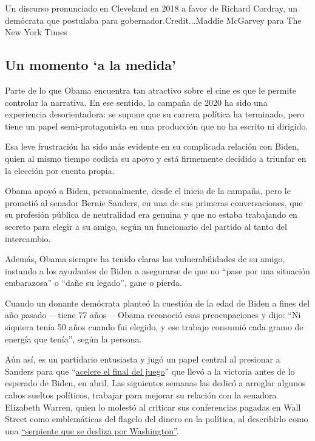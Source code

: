 Un discurso pronunciado en Cleveland en 2018 a favor de Richard Cordray,
un demócrata que postulaba para gobernador.Credit...Maddie McGarvey para
The New York Times

\hypertarget{un-momento-a-la-medida}{%
\subsection{Un momento `a la medida'}\label{un-momento-a-la-medida}}

Parte de lo que Obama encuentra tan atractivo sobre el cine es que le
permite controlar la narrativa. En ese sentido, la campaña de 2020 ha
sido una experiencia desorientadora: se supone que su carrera política
ha terminado, pero tiene un papel semi-protagonista en una producción
que no ha escrito ni dirigido.

Esa leve frustración ha sido más evidente en su complicada relación con
Biden, quien al mismo tiempo codicia su apoyo y está firmemente decidido
a triunfar en la elección por cuenta propia.

Obama apoyó a Biden, personalmente, desde el inicio de la campaña, pero
le prometió al senador Bernie Sanders, en una de sus primeras
conversaciones, que su profesión pública de neutralidad era genuina y
que no estaba trabajando en secreto para elegir a su amigo, según un
funcionario del partido al tanto del intercambio.

Además, Obama siempre ha tenido claras las vulnerabilidades de su amigo,
instando a los ayudantes de Biden a asegurarse de que no ``pase por una
situación embarazosa'' o ``dañe su legado'', gane o pierda.

Cuando un donante demócrata planteó la cuestión de la edad de Biden a
fines del año pasado ---tiene 77 años--- Obama reconoció esas
preocupaciones y dijo: ``Ni siquiera tenía 50 años cuando fui elegido, y
ese trabajo consumió cada gramo de energía que tenía'', según la
persona.

Aún así, es un partidario entusiasta y jugó un papel central al
presionar a Sanders para que
``\href{https://www.nytimes.com/2020/04/14/us/politics/obama-biden-democratic-primary.html}{acelere
el final del juego}'' que llevó a la victoria antes de lo esperado de
Biden, en abril. Las siguientes semanas las dedicó a arreglar algunos
cabos sueltos políticos, trabajar para mejorar su relación con la
senadora Elizabeth Warren, quien lo molestó al criticar sus conferencias
pagadas en Wall Street como emblemáticas del flagelo del dinero en la
política, al describirlo como una
\href{https://www.masslive.com/opinion/2017/04/warren_is_right_about_speaking.html}{``serpiente
que se desliza por Washington''}.

